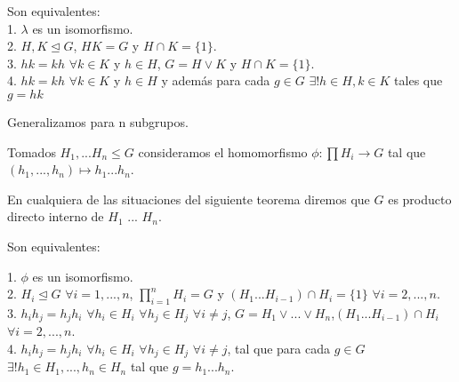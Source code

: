 \begin{nth}
Son equivalentes:\\
1. $\lambda$ es un isomorfismo.\\
2. $H,K \trianglelefteq G$, $HK = G$ y $H \cap K = \{1\}$.\\
3. $hk = kh$ $\forall k \in K$ y $h \in H$, $G = H \lor K$ y $H \cap K = \{1\}$.\\
4. $hk = kh$ $\forall k \in K$ y $h \in H$ y además para cada $g \in G$ $\exists  ! h \in H, k \in K$ tales que $g = hk$
\end{nth}

Generalizamos para n subgrupos.

Tomados $H_1,...H_n \le G$ consideramos el homomorfismo $\phi:\prod H_i \rightarrow G$ tal que $(h_1,...,h_n) \mapsto h_1...h_n$.

En cualquiera de las situaciones del siguiente teorema diremos que $G$ es producto directo interno de $H_1$ ... $H_n$.

\begin{nth}
Son equivalentes:

1. $\phi$ es un isomorfismo.\\
2. $H_i \trianglelefteq G$ $\forall i = 1,...,n$, $\prod_{i=1}^{n} H_i = G$ y $(H_1...H_{i-1}) \cap H_i = \{1\}$ $\forall i = 2,...,n$.\\
3. $h_i h_j = h_j h_i$ $\forall h_i \in H_i$ $\forall h_j \in H_j$ $\forall i \neq j$, $G = H_1 \lor ... \lor H_n$,$(H_1...H_{i-1})\cap H_i$ $\forall i=2,...,n$.\\
4. $h_ih_j = h_jh_i$ $\forall h_i \in H_i$ $\forall h_j \in H_j$ $\forall i \neq j$, tal que para cada $g \in G$ $\exists ! h_1 \in H_1,...,h_n \in H_n$ tal que $g = h_1...h_n$.
\end{nth}



